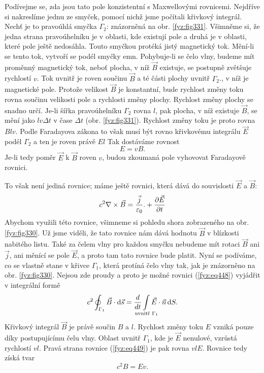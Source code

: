   Podívejme se, zda jsou tato pole konzistentní s Maxwellovými rovnicemi. Nejdříve si nakreslíme 
  jednu ze smyček, pomocí nichž jsme počítali křivkový integrál. Nechť je to pravoúhlá smyčka 
  \(\Gamma_2\): znázorněná na obr. \ref{fyz:fig331}. Všimněme si, že jedna strana pravoúhelníku je 
  v oblasti, kde existují pole a druhá je v oblasti, které pole ještě nedosáhla. Touto smyčkou 
  protéká jistý magnetický tok. Mění-li se tento tok, vytvoří se podél smyčky emn. Pohybuje-li se 
  čelo vlny, budeme mít proměnný magnetický tok, neboť plocha, v níž \(\vec{B}\) existuje, se 
  postupně zvětšuje rychlostí \(v\). Tok uvnitř je roven součinu \(\vec{B}\) a té části plochy 
  uvnitř \(\Gamma_2\)., v níž je magnetické pole. Protože velikost \(\vec{B}\) je konstantní, bude 
  rychlost změny toku rovna součinu velikosti pole a rychlosti změny plochy. Rychlost změny plochy 
  se snadno určí. Je-li šířka pravoúhelníku \(\Gamma_2\) rovna \(l\), pak plocha, v níž existuje 
  \(\vec{B}\), se mění jako \(lv\Delta t\) v čase \(\Delta t\) (obr. \ref{fyz:fig331}). Rychlost 
  změny toku je proto rovna \(Blv\). Podle Faradayova zákona to však musí být rovno křivkovému 
  integrálu \(\vec{E}\) podél \(\Gamma_2\) a ten je roven právě \(El\) Tak dostáváme rovnost
  \begin{equation}\label{fyz:eq447}
    E = vB.
  \end{equation}
  Je-li tedy poměr \(\vec{E}\) k \(\vec{B}\) roven \(v\), budou zkoumaná pole vyhovovat Faradayově 
  rovnici. 
  
  To však není jediná rovnice; máme ještě rovnici, která dává do souvislosti \(\vec{E}\) a 
  \(\vec{B}\):
  \begin{equation}\label{fyz:eq448}
    c^2\nabla\times\vec{B}  = \frac{\vec{j}}{\varepsilon_0}.+ \dfrac{\partial \vec{E}}{\partial t}
  \end{equation}
  Abychom využili této rovnice, všimneme si pohledu shora zobrazeného na obr. \ref{fyz:fig330}. Už 
  jsme viděli, že tato rovnice nám dává hodnotu \(\vec{B}\) v blízkosti nabitého listu. Také za 
  čelem vlny pro každou smyčku nebudeme mít rotaci \(\vec{B}\) ani \(\vec{j}\), ani měnící se pole 
  \(\vec{E}\), a proto tam tato rovnice bude platit. Nyní se podíváme, co se vlastně stane v křivce 
  \(\Gamma_1\), která protíná čelo vlny tak, jak je znázorněno na obr. \ref{fyz:fig330}. Nejsou zde 
  proudy a proto je možné rovnici (\ref{fyz:eq448}) vyjádřit v integrální formě
  \begin{equation}\label{fyz:eq449}
    c^2\oint_{\Gamma_1}\vec{B}\cdot\dd{\vec{s}}  = 
    \der{ }{t}\limitint_{\mathclap{\text{uvnitř }\Gamma_1}}\vec{E}\cdot\vec{n}\dd{S}.
  \end{equation}
  Křivkový integrál \(\vec{B}\) je právě součin \(B\) a \(l\). Rychlost změny toku \(E\) vzniká 
  pouze díky postupujícímu čelu vlny. Oblast uvnitř \(\Gamma_1\), kde je \(\vec{E}\) nenulové, 
  vzrůstá rychlostí \(vl\). Pravá strana rovnice (\ref{fyz:eq449}) je pak rovna \(vlE\). Rovnice 
  tedy získá tvar
  \begin{equation}\label{fyz:eq450}
    c^2B = Ev.
  \end{equation}

